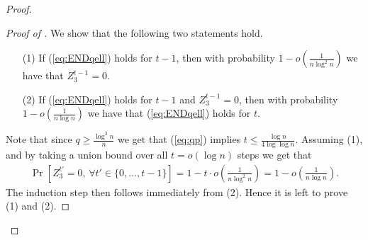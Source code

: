 \documentclass{article}
\begin{document}
\begin{proof}
\begin{proof}[Proof of ]
		We show that the following two statements hold.
		\begin{enumerate}
			\item[(1)] If (\ref{eq:ENDqell}) holds for $t-1$, then with probability $1 - o\left(\frac{1}{n\log^2 n} \right)$ we have that $Z^{t-1}_3 = 0$.
			\item[(2)] If (\ref{eq:ENDqell}) holds for $t-1$ and $Z^{t-1}_3 = 0$, then with probability $1 - o\left(\frac{1}{n\log n} \right)$ we have that (\ref{eq:ENDqell}) holds for $t$.
		\end{enumerate}
		Note that since $q \ge \frac{\log^3 n}{n}$ we get that (\ref{eq:qp}) implies $t \le \frac{\log n}{4\log\log n}$.
		Assuming (1), and by taking a union bound over all $t = o(\log n)$ steps we get that
		\begin{align*}
		\Pr\left[Z^{t'}_3 = 0 ,\, \forall t' \in \{0, \ldots, t-1 \} \right] = 1 - t\cdot o\left(\tfrac{1}{n\log^2 n} \right) = 1 - o\left(\tfrac{1}{n\log n} \right).
		\end{align*}
		The induction step then follows immediately from (2).
		Hence it is left to prove (1) and (2).
		

\end{proof}
\end{proof}
\end{document}
